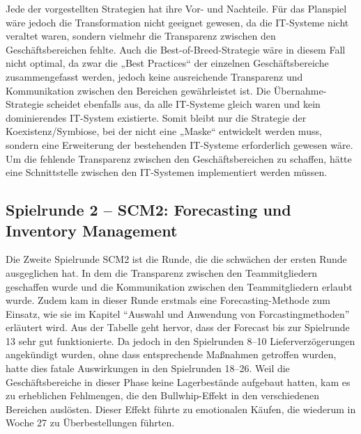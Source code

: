 \documentclass[a4paper,12pt]{article}
\begin{document}
Jede der vorgestellten Strategien hat ihre Vor- und Nachteile. Für das Planspiel wäre jedoch die Transformation nicht geeignet gewesen,
da die IT-Systeme nicht veraltet waren, sondern vielmehr die Transparenz zwischen den Geschäftsbereichen fehlte.
Auch die Best-of-Breed-Strategie wäre in diesem Fall nicht optimal, da zwar die „Best Practices“ der einzelnen Geschäftsbereiche zusammengefasst werden,
jedoch keine ausreichende Transparenz und Kommunikation zwischen den Bereichen gewährleistet ist.
Die Übernahme-Strategie scheidet ebenfalls aus, da alle IT-Systeme gleich waren und kein dominierendes IT-System existierte.
Somit bleibt nur die Strategie der Koexistenz/Symbiose, bei der nicht eine „Maske“ entwickelt werden muss,
sondern eine Erweiterung der bestehenden IT-Systeme erforderlich gewesen wäre. Um die fehlende Transparenz zwischen den Geschäftsbereichen zu schaffen,
hätte eine Schnittstelle zwischen den IT-Systemen implementiert werden müssen.

\newpage
\subsection{Spielrunde 2 – SCM2: Forecasting und Inventory Management}
Die Zweite Spielrunde SCM2 ist die Runde, die die schwächen der ersten Runde ausgeglichen hat.
In dem die Transparenz zwischen den Teammitgliedern geschaffen wurde und die Kommunikation zwischen den Teammitgliedern erlaubt wurde.
Zudem kam in dieser Runde erstmals eine Forecasting-Methode zum Einsatz, wie sie im Kapitel \enquote{Auswahl und Anwendung von Forcastingmethoden} erläutert wird.
Aus der Tabelle geht hervor, dass der Forecast bis zur Spielrunde 13 sehr gut funktionierte.
Da jedoch in den Spielrunden 8–10 Lieferverzögerungen angekündigt wurden, ohne dass entsprechende Maßnahmen getroffen wurden, hatte dies fatale Auswirkungen in den Spielrunden 18–26.
Weil die Geschäftsbereiche in dieser Phase keine Lagerbestände aufgebaut hatten, kam es zu erheblichen Fehlmengen, die den Bullwhip-Effekt in den verschiedenen Bereichen auslösten.
Dieser Effekt führte zu emotionalen Käufen, die wiederum in Woche 27 zu Überbestellungen führten.
\end{document}
